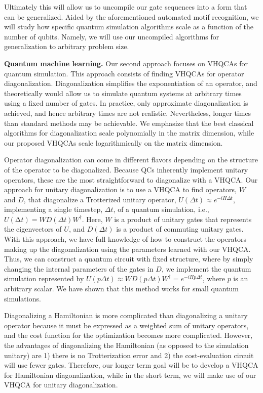 \documentclass[11pt]{article}
\begin{document}
Ultimately this will allow us to uncompile our gate sequences into a form that can be generalized. Aided by the aforementioned automated motif recognition, we will study how specific quantum simulation algorithms scale as a function of the number of qubits. Namely, we will use our uncompiled algorithms for generalization to arbitrary problem size. 


\textbf{Quantum machine learning.} Our second approach focuses on VHQCAs for quantum simulation. This approach consists of finding VHQCAs for operator diagonalization. Diagonalization simplifies the exponentiation of an operator, and theoretically would allow us to simulate quantum systems at arbitrary times using a fixed number of gates. In practice, only approximate diagonalization is achieved, and hence arbitrary times are not realistic. Nevertheless, longer times than standard methods may be achievable. We emphasize that the best classical algorithms for diagonalization scale polynomially in the matrix dimension, while our proposed VHQCAs scale logarithmically on the matrix dimension. 

Operator diagonalization can come in different flavors depending on the structure of the operator to be diagonalized. Because QCs inherently implement unitary operators, these are the most straightforward to diagonalize with a VHQCA. Our approach for unitary diagonalization is to use a VHQCA to find operators, $W$ and $D$, that diagonalize a Trotterized unitary operator, $U(\Delta t) \approx  e^{-iH\Delta t}$, implementing a single timestep, $\Delta t$, of a quantum simulation, i.e., $U(∆t)=WD(\Delta t)W^\dagger$. Here, $W$ is a product of unitary gates that represents the eigenvectors of $U$, and $D(\Delta t)$ is a product of commuting unitary gates. With this approach, we have full knowledge of how to construct the operators making up the diagonalization using the parameters learned with our VHQCA. Thus, we can construct a quantum circuit with fixed structure, where by simply changing the internal parameters of the gates in $D$, we implement the quantum simulation represented by $U(p\Delta t) \approx WD(p\Delta t)W^\dagger = e^{-iH p \Delta t}$, where $p$ is an arbitrary scalar. We have shown that this method works for small quantum simulations.

Diagonalizing a Hamiltonian is more complicated than diagonalizing a unitary operator because it must be expressed as a weighted sum of unitary operators, and the cost function for the optimization becomes more complicated. However, the advantages of diagonalizing the Hamiltonian (as opposed to the simulation unitary) are 1) there is no Trotterization error and 2) the cost-evaluation circuit will use fewer gates. Therefore, our longer term goal will be to develop a VHQCA for Hamiltonian diagonalization, while in the short term, we will make use of our VHQCA for unitary diagonalization.
\end{document}
